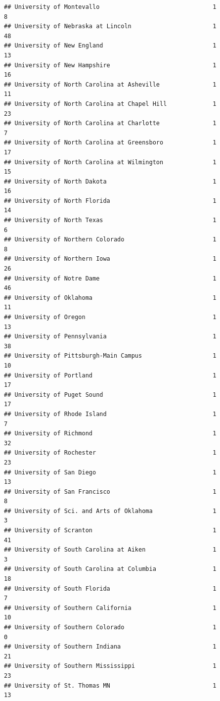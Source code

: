 \documentclass[
]{article}
\begin{document}
\begin{verbatim}
## University of Montevallo                                1           8
## University of Nebraska at Lincoln                       1          48
## University of New England                               1          13
## University of New Hampshire                             1          16
## University of North Carolina at Asheville               1          11
## University of North Carolina at Chapel Hill             1          23
## University of North Carolina at Charlotte               1           7
## University of North Carolina at Greensboro              1          17
## University of North Carolina at Wilmington              1          15
## University of North Dakota                              1          16
## University of North Florida                             1          14
## University of North Texas                               1           6
## University of Northern Colorado                         1           8
## University of Northern Iowa                             1          26
## University of Notre Dame                                1          46
## University of Oklahoma                                  1          11
## University of Oregon                                    1          13
## University of Pennsylvania                              1          38
## University of Pittsburgh-Main Campus                    1          10
## University of Portland                                  1          17
## University of Puget Sound                               1          17
## University of Rhode Island                              1           7
## University of Richmond                                  1          32
## University of Rochester                                 1          23
## University of San Diego                                 1          13
## University of San Francisco                             1           8
## University of Sci. and Arts of Oklahoma                 1           3
## University of Scranton                                  1          41
## University of South Carolina at Aiken                   1           3
## University of South Carolina at Columbia                1          18
## University of South Florida                             1           7
## University of Southern California                       1          10
## University of Southern Colorado                         1           0
## University of Southern Indiana                          1          21
## University of Southern Mississippi                      1          23
## University of St. Thomas MN                             1          13

\end{verbatim}
\end{document}

